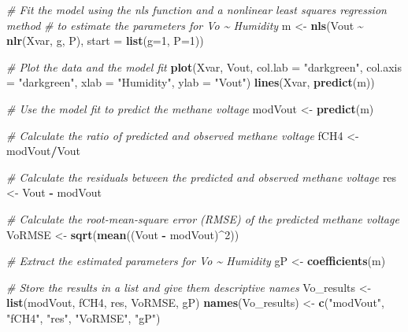 \documentclass[
]{article}
\newenvironment{Shaded}{\begin{snugshade}}{\end{snugshade}}
\newcommand{\AttributeTok}[1]{\textcolor[rgb]{0.13,0.29,0.53}{#1}}
\newcommand{\CommentTok}[1]{\textcolor[rgb]{0.56,0.35,0.01}{\textit{#1}}}
\newcommand{\DecValTok}[1]{\textcolor[rgb]{0.00,0.00,0.81}{#1}}
\newcommand{\FunctionTok}[1]{\textcolor[rgb]{0.13,0.29,0.53}{\textbf{#1}}}
\newcommand{\NormalTok}[1]{#1}
\newcommand{\OtherTok}[1]{\textcolor[rgb]{0.56,0.35,0.01}{#1}}
\newcommand{\SpecialCharTok}[1]{\textcolor[rgb]{0.81,0.36,0.00}{\textbf{#1}}}
\newcommand{\StringTok}[1]{\textcolor[rgb]{0.31,0.60,0.02}{#1}}
\begin{document}
\begin{Shaded}
\begin{Highlighting}[]
  \CommentTok{\# Fit the model using the nls function and a nonlinear least squares regression method}
  \CommentTok{\# to estimate the parameters for Vo \textasciitilde{} Humidity}
\NormalTok{  m }\OtherTok{\textless{}{-}} \FunctionTok{nls}\NormalTok{(Vout }\SpecialCharTok{\textasciitilde{}} \FunctionTok{nlr}\NormalTok{(Xvar, g, P), }\AttributeTok{start =} \FunctionTok{list}\NormalTok{(}\AttributeTok{g=}\DecValTok{1}\NormalTok{, }\AttributeTok{P=}\DecValTok{1}\NormalTok{))}
  
  \CommentTok{\# Plot the data and the model fit}
  \FunctionTok{plot}\NormalTok{(Xvar, Vout, }\AttributeTok{col.lab =} \StringTok{"darkgreen"}\NormalTok{, }\AttributeTok{col.axis =} \StringTok{"darkgreen"}\NormalTok{, }\AttributeTok{xlab =} \StringTok{"Humidity"}\NormalTok{, }\AttributeTok{ylab =} \StringTok{"Vout"}\NormalTok{)}
  \FunctionTok{lines}\NormalTok{(Xvar, }\FunctionTok{predict}\NormalTok{(m))}
  
  \CommentTok{\# Use the model fit to predict the methane voltage }
\NormalTok{  modVout }\OtherTok{\textless{}{-}} \FunctionTok{predict}\NormalTok{(m)}
  
  \CommentTok{\# Calculate the ratio of predicted and observed methane voltage}
\NormalTok{  fCH4 }\OtherTok{\textless{}{-}}\NormalTok{ modVout}\SpecialCharTok{/}\NormalTok{Vout}
  
  \CommentTok{\# Calculate the residuals between the predicted and observed methane voltage}
\NormalTok{  res }\OtherTok{\textless{}{-}}\NormalTok{ Vout }\SpecialCharTok{{-}}\NormalTok{ modVout}
  
  \CommentTok{\# Calculate the root{-}mean{-}square error (RMSE) of the predicted methane voltage}
\NormalTok{  VoRMSE }\OtherTok{\textless{}{-}} \FunctionTok{sqrt}\NormalTok{(}\FunctionTok{mean}\NormalTok{((Vout }\SpecialCharTok{{-}}\NormalTok{ modVout)}\SpecialCharTok{\^{}}\DecValTok{2}\NormalTok{))}
  
  \CommentTok{\# Extract the estimated parameters for Vo \textasciitilde{} Humidity}
\NormalTok{  gP }\OtherTok{\textless{}{-}} \FunctionTok{coefficients}\NormalTok{(m)}
  
  \CommentTok{\# Store the results in a list and give them descriptive names}
\NormalTok{  Vo\_results }\OtherTok{\textless{}{-}} \FunctionTok{list}\NormalTok{(modVout, fCH4, res, VoRMSE, gP)}
  \FunctionTok{names}\NormalTok{(Vo\_results) }\OtherTok{\textless{}{-}} \FunctionTok{c}\NormalTok{(}\StringTok{"modVout"}\NormalTok{, }\StringTok{"fCH4"}\NormalTok{, }\StringTok{"res"}\NormalTok{, }\StringTok{"VoRMSE"}\NormalTok{, }\StringTok{"gP"}\NormalTok{)}
  

\end{Highlighting}
\end{Shaded}
\end{document}
